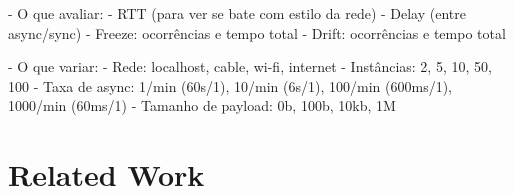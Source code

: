 \documentclass[sigplan,screen]{acmart}
\begin{document}
- O que avaliar:
    - RTT (para ver se bate com estilo da rede)
    - Delay (entre async/sync)
    - Freeze: ocorrências e tempo total
    - Drift: ocorrências e tempo total

- O que variar:
    - Rede: localhost, cable, wi-fi, internet
    - Instâncias: 2, 5, 10, 50, 100
    - Taxa de async: 1/min (60s/1), 10/min (6s/1), 100/min (600ms/1), 1000/min (60ms/1)
    - Tamanho de payload: 0b, 100b, 10kb, 1M


\section{Related Work}
\label{sec.related}
\end{document}
